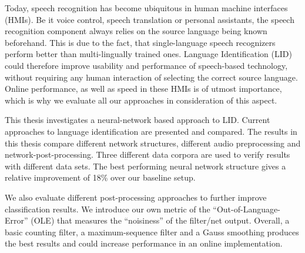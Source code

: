 
\Abstract
Today, speech recognition has become ubiquitous in human machine interfaces (HMIs). Be it voice control, speech translation or personal assistants, the speech recognition component always relies on the source language being known beforehand. This is due to the fact, that single-language speech recognizers perform better than multi-lingually trained ones. Language Identification  (LID) could therefore improve usability and performance of speech-based technology, without requiring any human interaction of selecting the correct source language. Online performance, as well as speed in these HMIs is of utmost importance, which is why we evaluate all our approaches in consideration of this aspect.

This thesis investigates a neural-network based approach to LID. Current approaches to language identification are presented and compared. The results in this thesis compare different network structures, different audio preprocessing and network-post-processing. Three different data corpora are used to verify results with different data sets. The best performing neural network structure gives a relative improvement of 18\% over our baseline setup.

We also evaluate different post-processing approaches to further improve classification results. We introduce our own metric of the ``Out-of-Language-Error'' (OLE) that measures the ``noisiness'' of the filter/net output. Overall, a basic counting filter, a maximum-sequence filter and a Gauss smoothing produces the best results and could increase performance in an online implementation.




